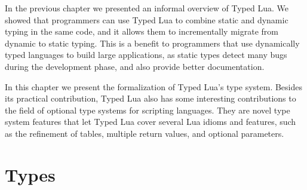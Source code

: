 
In the previous chapter we presented an informal overview of Typed Lua.
We showed that programmers can use Typed Lua to combine static and dynamic
typing in the same code, and it allows them to incrementally migrate from
dynamic to static typing.
This is a benefit to programmers that use dynamically typed languages
to build large applications, as static types detect many bugs
during the development phase, and also provide better documentation.

In this chapter we present the formalization of Typed Lua's type system.
Besides its practical contribution, Typed Lua also has some interesting
contributions to the field of optional type systems for scripting
languages.
They are novel type system features that let Typed Lua cover several Lua idioms
and features, such as the refinement of tables, multiple return values,
and optional parameters.

\section{Types}
\label{sec:types}

